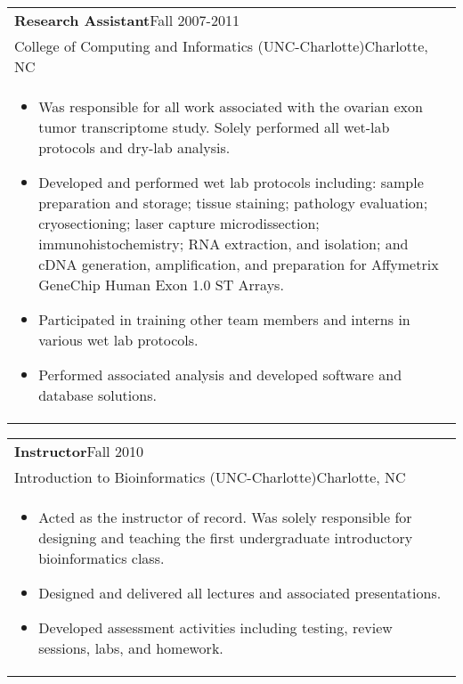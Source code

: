 \documentclass[12pt]{report}
\def\fullLength{6.5in}
\begin{document}
\begin{table}[!ht]
\begin{tabular}{p{\fullLength}}
\textbf{Research Assistant}\hfill Fall 2007-2011\\
College of Computing and Informatics (UNC-Charlotte)\hfill Charlotte, NC\\
\vspace{-7.0mm}
\begin{itemize}\addtolength{\itemsep}{-0.5\baselineskip}
\item Was responsible for all work associated with the ovarian exon tumor transcriptome study. Solely performed all wet-lab protocols and dry-lab analysis.
\item Developed and performed wet lab protocols including: sample preparation and storage; tissue staining; pathology evaluation; cryosectioning; laser capture microdissection; immunohistochemistry; RNA extraction, and isolation; and cDNA generation, amplification, and preparation for Affymetrix GeneChip Human Exon 1.0 ST Arrays.
\item Participated in training other team members and interns in various wet lab protocols.
\item Performed associated analysis and developed software and database solutions.
\end{itemize}
\end{tabular}
\end{table}

\vspace{-5.0mm}

\begin{table}[!h]
\begin{tabular}{p{\fullLength}}
\textbf{Instructor}\hfill Fall 2010\\
Introduction to Bioinformatics (UNC-Charlotte)\hfill Charlotte, NC\\
\vspace{-7.0mm}
\begin{itemize}\addtolength{\itemsep}{-0.5\baselineskip}
\item Acted as the instructor of record. Was solely responsible for designing and teaching the first undergraduate introductory bioinformatics class.
\item Designed and delivered all lectures and associated presentations.
\item Developed assessment activities including testing, review sessions, labs, and homework.
\end{itemize}
\end{tabular}
\end{table}
\end{document}

